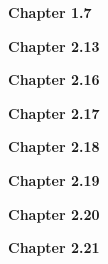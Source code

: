 \documentclass[12pt,letterpaper]{article}
\begin{document}
\textbf{Chapter 1.7} \label{sec:chapter1.7}

%
\textbf{Chapter 2.13} \label{sec:chapter2.13}

\textbf{Chapter 2.16} \label{sec:chapter2.16}

\textbf{Chapter 2.17} \label{sec:chapter2.17}

\textbf{Chapter 2.18} \label{sec:chapter2.18}

\textbf{Chapter 2.19} \label{sec:chapter2.19}

\textbf{Chapter 2.20} \label{sec:chapter2.20}

\textbf{Chapter 2.21} \label{sec:chapter2.21}

\end{document}
